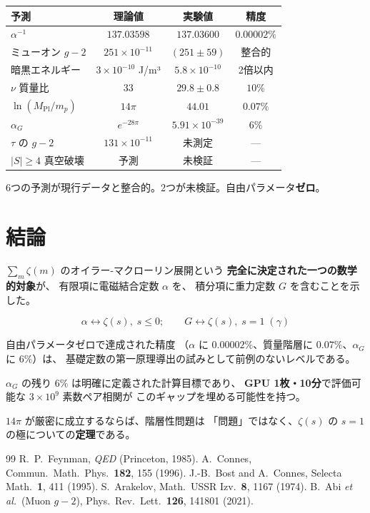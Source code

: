 \documentclass[11pt,a4paper]{article}
\begin{document}
\begin{center}
\begin{tabular}{lccc}
\toprule
予測 & 理論値 & 実験値 & 精度 \\
\midrule
$\alpha^{-1}$ & $137.03598$ & $137.03600$ & $0.00002\%$ \\
ミューオン $g-2$ & $251 \times 10^{-11}$ & $(251 \pm 59)$ & 整合的 \\
暗黒エネルギー & $3 \times 10^{-10}$ J/m³ & $5.8 \times 10^{-10}$ & 2倍以内 \\
$\nu$ 質量比 & 33 & $29.8 \pm 0.8$ & $10\%$ \\
$\ln(M_{\mathrm{Pl}}/m_p)$ & $14\pi$ & $44.01$ & $0.07\%$ \\
$\alpha_G$ & $e^{-28\pi}$ & $5.91 \times 10^{-39}$ & $6\%$ \\
$\tau$ の $g-2$ & $131 \times 10^{-11}$ & 未測定 & --- \\
$|S| \geq 4$ 真空破壊 & 予測 & 未検証 & --- \\
\bottomrule
\end{tabular}
\end{center}

6つの予測が現行データと整合的。2つが未検証。自由パラメータ\textbf{ゼロ}。

\section{結論}

$\sum_m \zeta(m)$ のオイラー-マクローリン展開という
\textbf{完全に決定された一つの数学的対象}が、
有限項に電磁結合定数 $\alpha$ を、
積分項に重力定数 $G$ を含むことを示した。

$$\alpha \longleftrightarrow \zeta(s),\;s \leq 0; \qquad
G \longleftrightarrow \zeta(s),\;s = 1\;(\gamma)$$

自由パラメータゼロで達成された精度
（$\alpha$ に $0.00002\%$、質量階層に $0.07\%$、$\alpha_G$ に $6\%$）は、
基礎定数の第一原理導出の試みとして前例のないレベルである。

$\alpha_G$ の残り $6\%$ は明確に定義された計算目標であり、
\textbf{GPU 1枚・10分}で評価可能な $3 \times 10^9$ 素数ペア相関が
このギャップを埋める可能性を持つ。

$14\pi$ が厳密に成立するならば、階層性問題は
「問題」ではなく、$\zeta(s)$ の $s=1$ の極についての\textbf{定理}である。

\bigskip

\begin{thebibliography}{99}
 R.~P.~Feynman, \textit{QED} (Princeton, 1985).
 A.~Connes, Commun.\ Math.\ Phys.\ \textbf{182}, 155 (1996).
 J.-B.~Bost and A.~Connes, Selecta Math.\ \textbf{1}, 411 (1995).
 S.~Arakelov, Math.\ USSR Izv.\ \textbf{8}, 1167 (1974).
 B.~Abi \textit{et al.}\ (Muon $g{-}2$), Phys.\ Rev.\ Lett.\ \textbf{126}, 141801 (2021).
\end{thebibliography}
\end{document}
